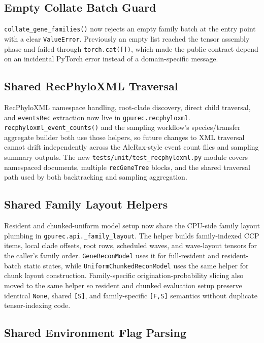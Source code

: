\documentclass[11pt]{article}
\begin{document}
\subsection{Empty Collate Batch Guard}

\texttt{collate\_gene\_families()} now rejects an empty family batch at the
entry point with a clear \texttt{ValueError}.  Previously an empty list reached
the tensor assembly phase and failed through \texttt{torch.cat([])}, which made
the public contract depend on an incidental PyTorch error instead of a
domain-specific message.

\subsection{Shared RecPhyloXML Traversal}

RecPhyloXML namespace handling, root-clade discovery, direct child traversal,
and \texttt{eventsRec} extraction now live in
\texttt{gpurec.recphyloxml}.  \texttt{recphyloxml\_event\_counts()} and the
sampling workflow's species/transfer aggregate builder both use those helpers,
so future changes to XML traversal cannot drift independently across the
AleRax-style event count files and sampling summary outputs.  The new
\texttt{tests/unit/test\_recphyloxml.py} module covers namespaced documents,
multiple \texttt{recGeneTree} blocks, and the shared traversal path used by
both backtracking and sampling aggregation.

\subsection{Shared Family Layout Helpers}

Resident and chunked-uniform model setup now share the CPU-side family layout
plumbing in \texttt{gpurec.api.\_family\_layout}.  The helper builds
family-indexed CCP items, local clade offsets, root rows, scheduled waves, and
wave-layout tensors for the caller's family order.  \texttt{GeneReconModel}
uses it for full-resident and resident-batch static states, while
\texttt{UniformChunkedReconModel} uses the same helper for chunk layout
construction.  Family-specific origination-probability slicing also moved to
the same helper so resident and chunked evaluation setup preserve identical
\texttt{None}, shared \texttt{[S]}, and family-specific \texttt{[F,S]}
semantics without duplicate tensor-indexing code.

\subsection{Shared Environment Flag Parsing}
\end{document}
